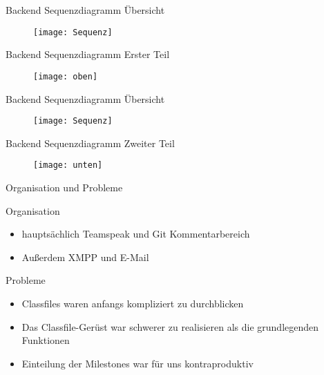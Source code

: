 \begin{frame}[fragile]{Backend Sequenzdiagramm Übersicht}
\begin{figure}[htp]
\begin{center}
\texttt{[image: Sequenz]}
\end{center}
\end{figure}
\end{frame}

\begin{frame}[fragile]{Backend Sequenzdiagramm Erster Teil}
\begin{figure}[htp]
\begin{center}
\texttt{[image: oben]}
\end{center}
\end{figure}
\end{frame}

\begin{frame}[fragile]{Backend Sequenzdiagramm Übersicht}
\begin{figure}[htp]
\begin{center}
\texttt{[image: Sequenz]}
\end{center}
\end{figure}
\end{frame}

\begin{frame}[fragile]{Backend Sequenzdiagramm Zweiter Teil}
\begin{figure}[htp]
\begin{center}
\texttt{[image: unten]}
\end{center}
\end{figure}
\end{frame}


\begin{frame}[fragile]{Organisation und Probleme}

\pause
Organisation
\pause
  \begin{itemize}
  \item hauptsächlich Teamspeak und Git Kommentarbereich
  \pause
  \item Außerdem XMPP und E-Mail 
  \pause
  \end{itemize}
Probleme
\pause
  \begin{itemize}
  \item Classfiles waren anfangs kompliziert zu durchblicken
  \pause
  \item Das Classfile-Gerüst war schwerer zu realisieren als die grundlegenden Funktionen
  \pause
  \item Einteilung der Milestones war für uns kontraproduktiv
  \end{itemize}
\end{frame}


